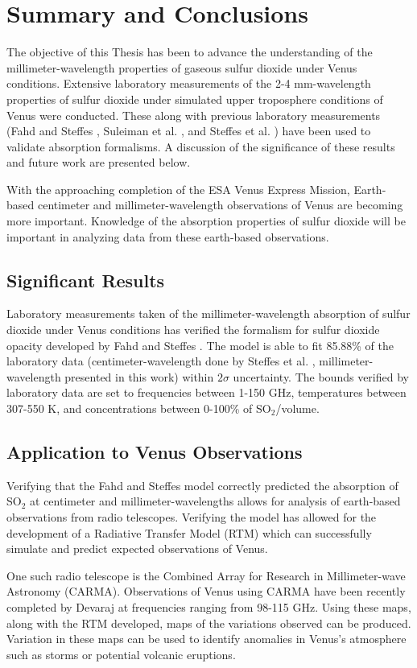 \chapter{Summary and Conclusions}
The objective of this Thesis has been to advance the understanding of the millimeter-wavelength properties of gaseous sulfur dioxide under Venus conditions. Extensive laboratory measurements of the 2-4 mm-wavelength properties of sulfur dioxide under simulated upper troposphere conditions of Venus were conducted. These along with previous laboratory measurements (Fahd and Steffes \cite{Fahd-1991}, Suleiman et al. \cite{Suleiman-1996}, and Steffes et al. \cite{Steffes-2015}) have been used to validate absorption formalisms. A discussion of the significance of these results and future work are presented below. 

With the approaching completion of the ESA Venus Express Mission, Earth-based centimeter and millimeter-wavelength observations of Venus are becoming more important. Knowledge of the absorption properties of sulfur dioxide will be important in analyzing data from these earth-based observations. 
\section{Significant Results}

Laboratory measurements taken of the millimeter-wavelength absorption of sulfur dioxide under Venus conditions has verified the formalism for sulfur dioxide opacity developed by Fahd and Steffes \cite{Fahd-1991}. The model is able to fit 85.88\% of the laboratory data (centimeter-wavelength done by Steffes et al. \cite{Steffes-2015}, millimeter-wavelength presented in this work) within $2\sigma$ uncertainty. The bounds verified by laboratory data are set to frequencies between 1-150 GHz, temperatures between 307-550 K, and concentrations between 0-100\% of SO$_2$/volume. 
\section{Application to Venus Observations}
Verifying that the Fahd and Steffes \cite{Fahd-1991} model correctly predicted the absorption of SO$_2$ at centimeter and millimeter-wavelengths allows for analysis of earth-based observations from radio telescopes. Verifying the model has allowed for the development of a Radiative Transfer Model (RTM) which can successfully simulate and predict expected observations of Venus. 

One such radio telescope is the Combined Array for Research in Millimeter-wave Astronomy (CARMA). Observations of Venus using CARMA have been recently completed by Devaraj \cite{Devaraj-CARMA} at frequencies ranging from 98-115 GHz. Using these maps, along with the RTM developed, maps of the variations observed can be produced. Variation in these maps can be used to identify anomalies in Venus's atmosphere such as storms or potential volcanic eruptions.

